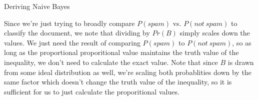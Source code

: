 \documentclass[11pt, nopagenumbers]{adamblan-hw}
\begin{document}
\begin{question}{Deriving Naive Bayes}

\begin{part}
Since we're just trying to broadly compare $P(spam)$ vs. $P(not \ spam)$ to classify
the document, we note that dividing by $Pr(B)$ simply scales down the values.
We just need the result of comparing $P(spam)$ to $P(not \ spam)$, so as long as the proportional
proporitional value maintains the truth value of the inequality, we don't need to calculate the exact value.
Note that since $B$ is drawn from some ideal distribution as well, we're scaling both probablities
down by the same factor which doesn't change the truth value of the inequality, so it is 
sufficient for us to just calculate the proporitional values. 
\end{part}    

\end{question}
\end{document}
